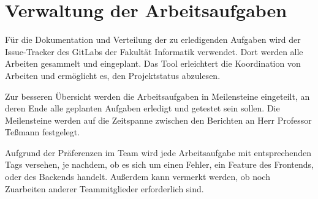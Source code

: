 
\section{Verwaltung der Arbeitsaufgaben}
\label{wi}

Für die Dokumentation und Verteilung der zu erledigenden Aufgaben wird der Issue-Tracker des GitLabs der Fakultät Informatik verwendet. Dort werden alle Arbeiten gesammelt und eingeplant. Das Tool erleichtert die Koordination von Arbeiten und ermöglicht es, den Projektstatus abzulesen.

Zur besseren Übersicht werden die Arbeitsaufgaben in Meilensteine eingeteilt, an deren Ende alle geplanten Aufgaben erledigt und getestet sein sollen. Die Meilensteine werden auf die Zeitspanne zwischen den Berichten an Herr Professor Teßmann festgelegt.

Aufgrund der Präferenzen im Team wird jede Arbeitsaufgabe mit entsprechenden Tags versehen, je nachdem, ob es sich um einen Fehler, ein Feature des Frontends, oder des Backends handelt. Außerdem kann vermerkt werden, ob noch Zuarbeiten anderer Teammitglieder erforderlich sind.
